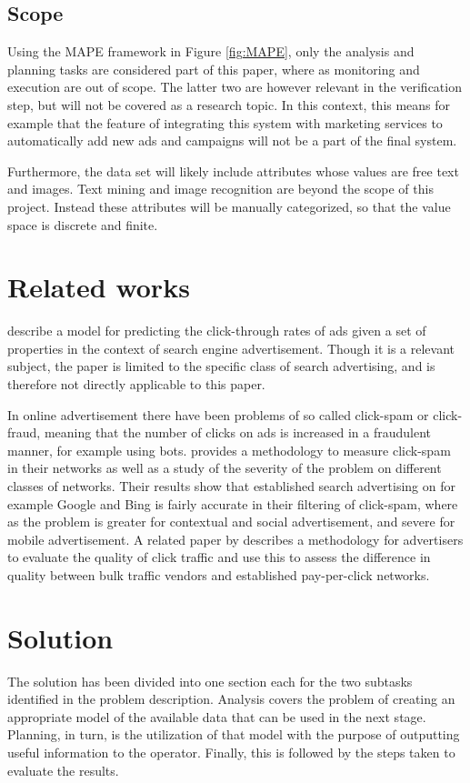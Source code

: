 \documentclass[10pt,twocolumn]{article}
\begin{document}
\subsection{Scope}
Using the MAPE framework in Figure \ref{fig:MAPE}, only the analysis and planning tasks are considered part of this paper, where as monitoring and execution are out of scope. The latter two are however relevant in the verification step, but will not be covered as a research topic. In this context, this means for example that the feature of integrating this system with marketing services to automatically add new ads and campaigns will not be a part of the final system.

Furthermore, the data set will likely include attributes whose values are free text and images. Text mining and image recognition are beyond the scope of this project. Instead these attributes will be manually categorized, so that the value space is discrete and finite.

\section{Related works}
\citet{Richardson2007} describe a model for predicting the click-through rates of ads given a set of properties in the context of search engine advertisement. Though it is a relevant subject, the paper is limited to the specific class of search advertising, and is therefore not directly applicable to this paper.

In online advertisement there have been problems of so called click-spam or click-fraud, meaning that the number of clicks on ads is increased in a fraudulent manner, for example using bots. \citet{Dave2012} provides a methodology to measure click-spam in their networks as well as a study of the severity of the problem on different classes of networks. Their results show that established search advertising on for example Google and Bing is fairly accurate in their filtering of click-spam, where as the problem is  greater for contextual and social advertisement, and severe for mobile advertisement. A related paper by \citet{Zhang2011} describes a methodology for advertisers to evaluate the quality of click traffic and use this to assess the difference in quality between bulk traffic vendors and established pay-per-click networks.

\section{Solution}
The solution has been divided into one section each for the two subtasks identified in the problem description. Analysis covers the problem of creating an appropriate model of the available data that can be used in the next stage. Planning, in turn, is the utilization of that model with the purpose of outputting useful information to the operator. Finally, this is followed by the steps taken to evaluate the results.
\end{document}
